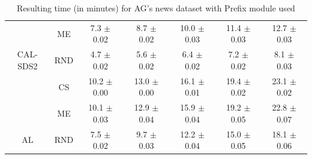 \begin{table}[htbp]
\begin{tabular*}{\linewidth}{c|c|@{\extracolsep{\fill}}ccccc}
 & ME & 7.3 $\pm$ {\small 0.02} & 8.7 $\pm$ {\small 0.02} & 10.0 $\pm$ {\small 0.03} & 11.4 $\pm$ {\small 0.03} & 12.7 $\pm$ {\small 0.03}\\

\multirow{-3}{*}{\raggedright\arraybackslash CAL-SDS2} & RND & 4.7 $\pm$ {\small 0.02} & 5.6 $\pm$ {\small 0.02} & 6.4 $\pm$ {\small 0.02} & 7.2 $\pm$ {\small 0.02} & 8.1 $\pm$ {\small 0.03}\\
\midrule
 & CS & 10.2 $\pm$ {\small 0.00} & 13.0 $\pm$ {\small 0.00} & 16.1 $\pm$ {\small 0.01} & 19.4 $\pm$ {\small 0.02} & 23.1 $\pm$ {\small 0.02}\\

 & ME & 10.1 $\pm$ {\small 0.03} & 12.9 $\pm$ {\small 0.04} & 15.9 $\pm$ {\small 0.04} & 19.2 $\pm$ {\small 0.05} & 22.8 $\pm$ {\small 0.07}\\

\multirow{-3}{*}{\raggedright\arraybackslash AL} & RND & 7.5 $\pm$ {\small 0.02} & 9.7 $\pm$ {\small 0.03} & 12.2 $\pm$ {\small 0.04} & 15.0 $\pm$ {\small 0.05} & 18.1 $\pm$ {\small 0.06}\\
\bottomrule
\end{tabular*}
\caption{Resulting time (in minutes) for AG's news dataset with Prefix module used}
\label{tab:time_full_agnews_10_prefix}
\end{table}
